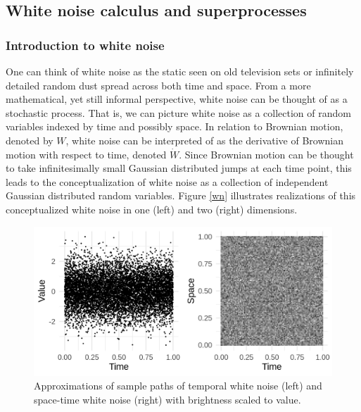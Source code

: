 \documentclass[]{article}
\begin{document}
\hypertarget{white-noise-calculus-and-superprocesses}{%
\subsection{\texorpdfstring{White noise calculus and superprocesses
\label{wnc}}{White noise calculus and superprocesses }}\label{white-noise-calculus-and-superprocesses}}

\hypertarget{introduction-to-white-noise}{%
\subsubsection{Introduction to white
noise}\label{introduction-to-white-noise}}

One can think of white noise as the static seen on old television sets
or infinitely detailed random dust spread across both time and space.
From a more mathematical, yet still informal perspective, white noise
can be thought of as a stochastic process. That is, we can picture white
noise as a collection of random variables indexed by time and possibly
space. In relation to Brownian motion, denoted by \(W\), white noise can
be interpreted of as the derivative of Brownian motion with respect to
time, denoted \(\dot W\). Since Brownian motion can be thought to take
infinitesimally small Gaussian distributed jumps at each time point,
this leads to the conceptualization of white noise as a collection of
independent Gaussian distributed random variables. Figure \ref{wn}
illustrates realizations of this conceptualized white noise in one
(left) and two (right) dimensions.

\begin{figure}

{\centering \includegraphics{wn} 

}

\caption{\label{wn}Approximations of sample paths of temporal white noise (left) and space-time white noise (right) with brightness scaled to value.}\label{fig:unnamed-chunk-2}
\end{figure}
\end{document}
